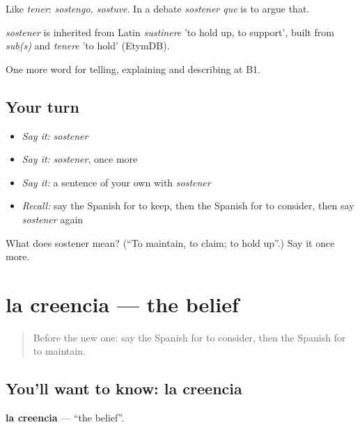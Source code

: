 Like \emph{tener}: \emph{sostengo, sostuve}. In a debate \emph{sostener que} is to argue that.

\begin{cousinweb}
\emph{sostener} is inherited from Latin \emph{sustinere} 'to hold up, to support', built from \emph{sub(s)} and \emph{tenere} 'to hold' (EtymDB).
\end{cousinweb}

\begin{grammarlens}[title={What you've built}]
One more word for telling, explaining and describing at B1.
\end{grammarlens}

\subsection*{Your turn}
\begin{itemize}
\raggedright
  \item \emph{Say it:} \emph{sostener}
  \item \emph{Say it:} \emph{sostener}, once more
  \item \emph{Say it:} a sentence of your own with \emph{sostener}
  \item \emph{Recall:} say the Spanish for to keep, then the Spanish for to consider, then say \emph{sostener} again
\end{itemize}

\begin{tcolorbox}[breakable,colback=teal!4,colframe=teal!35!black,title={Before you move on}]
What does sostener mean? (\textquotedblleft{}To maintain, to claim; to hold up\textquotedblright{}.) Say it once more.
\end{tcolorbox}
\section[la creencia]{la creencia — the belief}

\label{lesson:ES-C576-creencia}



\begin{quote}
Before the new one: say the Spanish for to consider, then the Spanish for to maintain.
\end{quote}

\subsection*{You'll want to know: la creencia}
\textbf{la creencia} — \textquotedblleft{}the belief\textquotedblright{}.

